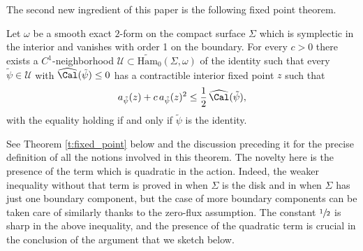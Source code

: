 The second new ingredient of this paper is the following fixed point theorem.

\begin{maintheorem}
\label{mt:fixed}
Let $\omega$ be a smooth exact $2$-form on the compact surface $\Sigma$ which is symplectic in the interior and vanishes with order 1 on the boundary. For every $c>0$ there exists a $C^1$-neighborhood $\mathcal{U}\subset\widetilde{\mathrm{Ham}}_0(\Sigma,\omega)$ of the identity such that every $\tilde{\psi}\in\mathcal{U}$ with $\widehat{\Cal}(\tilde{\psi})\leq 0$ has a contractible interior fixed point $z$ such that
\[
a_{\tilde{\psi}}(z) + c \, a_{\tilde{\psi}}(z)^2 \leq \frac{1}{2}\, \widehat{\Cal}(\tilde{\psi}),
\]
with the equality holding if and only if $\tilde{\psi}$ is the identity.
\end{maintheorem}

See Theorem \ref{t:fixed_point} below and the discussion preceding it for the precise definition of all the notions involved in this theorem. The novelty here is the presence of the term which is quadratic in the action. Indeed, the weaker inequality without that term is proved in \cite{Abbondandolo:2018fb} when $\Sigma$ is the disk and in \cite{Benedetti:2021aa} when $\Sigma$ has just one boundary component, but the case of more boundary components can be taken care of similarly thanks to the zero-flux assumption. The constant $\sfrac{1}{2}$ is sharp in the above inequality, and the presence of the quadratic term is crucial in the conclusion of the argument that we sketch below.

